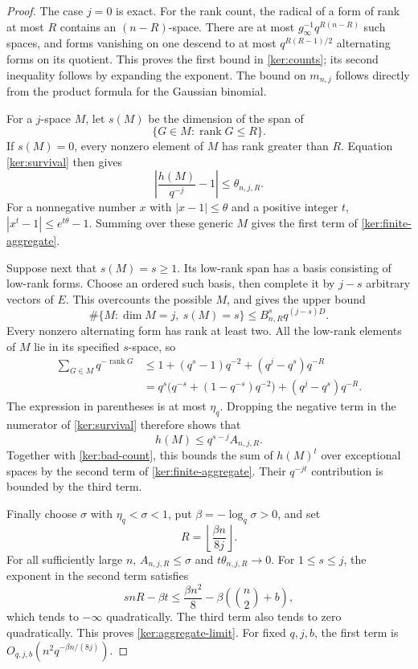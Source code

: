 \begin{proof}
The case $j=0$ is exact.  For the rank count, the radical of a form
of rank at most $R$ contains an $(n-R)$-space.  There are at most
$g_\infty^{-1}q^{R(n-R)}$ such spaces, and forms vanishing on one
descend to at most $q^{R(R-1)/2}$ alternating forms on its quotient.
This proves the first bound in \eqref{ker:counts}; its second
inequality follows by expanding the exponent.  The bound on
$m_{n,j}$ follows directly from the product formula for the Gaussian
binomial.

For a $j$-space $M$, let $s(M)$ be the dimension of the span of
\[
 \{G\in M:\operatorname{rank}G\le R\}.
\]
If $s(M)=0$, every nonzero element of $M$ has rank greater than $R$.
Equation \eqref{ker:survival} then gives
\[
 \left|\frac{h(M)}{q^{-j}}-1\right|
 \le\theta_{n,j,R}.
\]
For a nonnegative number $x$ with $|x-1|\le\theta$ and a positive
integer $t$, $|x^t-1|\le e^{t\theta}-1$.  Summing over these generic
$M$ gives the first term of \eqref{ker:finite-aggregate}.

Suppose next that $s(M)=s\ge1$.  Its low-rank span has a basis
consisting of low-rank forms.  Choose an ordered such basis, then
complete it by $j-s$ arbitrary vectors of $E$.  This overcounts the
possible $M$, and gives the upper bound
\begin{equation}
 \#\{M:\dim M=j,\ s(M)=s\}
 \le B_{n,R}^{s}q^{(j-s)D}.
 \label{ker:bad-count}
\end{equation}
Every nonzero alternating form has rank at least two.  All the
low-rank elements of $M$ lie in its specified $s$-space, so
\begin{align*}
 \sum_{G\in M}q^{-\operatorname{rank}G}
 &\le1+(q^s-1)q^{-2}+(q^j-q^s)q^{-R}\\
 &=q^s\bigl(q^{-s}+(1-q^{-s})q^{-2}\bigr)
      +(q^j-q^s)q^{-R}.
\end{align*}
The expression in parentheses is at most $\eta_q$.  Dropping the
negative term in the numerator of \eqref{ker:survival} therefore
shows that
\[
 h(M)\le q^{s-j}A_{n,j,R}.
\]
Together with \eqref{ker:bad-count}, this bounds the sum of
$h(M)^t$ over exceptional spaces by the second term of
\eqref{ker:finite-aggregate}.  Their $q^{-jt}$ contribution is bounded
by the third term.

Finally choose $\sigma$ with $\eta_q<\sigma<1$, put
$\beta=-\log_q\sigma>0$, and set
\[
 R=\left\lfloor\frac{\beta n}{8j}\right\rfloor.
\]
For all sufficiently large $n$, $A_{n,j,R}\le\sigma$ and
$t\theta_{n,j,R}\to0$.  For $1\le s\le j$, the exponent in the
second term satisfies
\[
 snR-\beta t
 \le\frac{\beta n^2}{8}
      -\beta\left(\binom n2+b\right),
\]
which tends to $-\infty$ quadratically.  The third term also tends
to zero quadratically.  This proves \eqref{ker:aggregate-limit}.
For fixed $q,j,b$, the first term is
$O_{q,j,b}(n^2q^{-\beta n/(8j)})$.
\end{proof}

